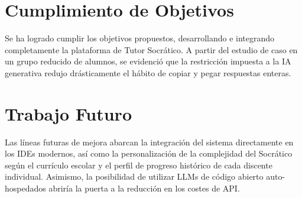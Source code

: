 \section{Cumplimiento de Objetivos}
Se ha logrado cumplir los objetivos propuestos, desarrollando e integrando completamente la plataforma de Tutor Socrático. A partir del estudio de caso en un grupo reducido de alumnos, se evidenció que la restricción impuesta a la IA generativa redujo drásticamente el hábito de copiar y pegar respuestas enteras.

\section{Trabajo Futuro}
Las líneas futuras de mejora abarcan la integración del sistema directamente en los IDEs modernos, así como la personalización de la complejidad del Socrático según el currículo escolar y el perfil de progreso histórico de cada discente individual. Asimismo, la posibilidad de utilizar LLMs de código abierto auto-hospedados abriría la puerta a la reducción en los costes de API.
